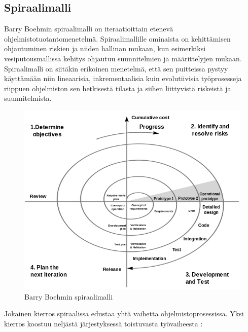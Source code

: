 \documentclass[finnish,12pt]{tktltiki2}
\theoremstyle{definition}
\theoremstyle{remark}
\begin{document}
\subsection{Spiraalimalli}

Barry Boehmin spiraalimalli on iteraatioittain etenevä ohjelmistotuotantomenetelmä. Spiraalimallille ominaista on kehittämisen ohjautuminen riskien ja niiden hallinan mukaan, kun esimerkiksi vesiputousmallissa kehitys ohjautuu suunnitelmien ja määrittelyjen mukaan. Spiraalimalli on siitäkin erikoinen menetelmä, että sen puitteissa pystyy käyttämään niin lineaarisia, inkrementaalisia kuin evolutiivisia työprosesseja riippuen ohjelmiston sen hetkisestä tilasta ja siihen liittyvistä riskeistä ja suunnitelmista. 

\begin{figure}[ht!]
\centering
{}
\includegraphics[width=150mm]{spiral.png}
\caption{Barry Boehmin spiraalimalli}
\label{overflow}
\end{figure}

Jokainen kierros spiraalissa edustaa yhtä vaihetta ohjelmistoprosessissa.  Yksi kierros koostuu neljästä järjestyksessä toistuvasta työvaiheesta \cite{Sommerville10}:
\end{document}

